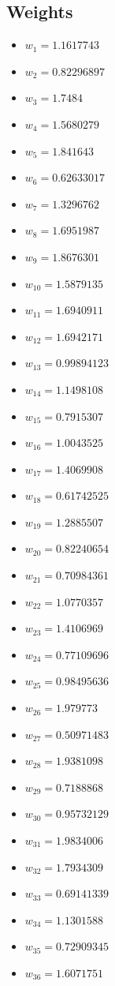 \documentclass[11pt]{article}
\begin{document}
\subsection*{Weights}
\begin{itemize}
\item $w_{1} = 1.1617743$
\item $w_{2} = 0.82296897$
\item $w_{3} = 1.7484$
\item $w_{4} = 1.5680279$
\item $w_{5} = 1.841643$
\item $w_{6} = 0.62633017$
\item $w_{7} = 1.3296762$
\item $w_{8} = 1.6951987$
\item $w_{9} = 1.8676301$
\item $w_{10} = 1.5879135$
\item $w_{11} = 1.6940911$
\item $w_{12} = 1.6942171$
\item $w_{13} = 0.99894123$
\item $w_{14} = 1.1498108$
\item $w_{15} = 0.7915307$
\item $w_{16} = 1.0043525$
\item $w_{17} = 1.4069908$
\item $w_{18} = 0.61742525$
\item $w_{19} = 1.2885507$
\item $w_{20} = 0.82240654$
\item $w_{21} = 0.70984361$
\item $w_{22} = 1.0770357$
\item $w_{23} = 1.4106969$
\item $w_{24} = 0.77109696$
\item $w_{25} = 0.98495636$
\item $w_{26} = 1.979773$
\item $w_{27} = 0.50971483$
\item $w_{28} = 1.9381098$
\item $w_{29} = 0.7188868$
\item $w_{30} = 0.95732129$
\item $w_{31} = 1.9834006$
\item $w_{32} = 1.7934309$
\item $w_{33} = 0.69141339$
\item $w_{34} = 1.1301588$
\item $w_{35} = 0.72909345$
\item $w_{36} = 1.6071751$

\end{itemize}
\end{document}
